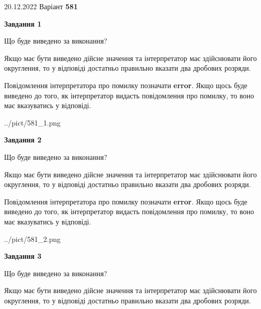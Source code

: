 \documentclass[12pt, ukrainian]{article}
\begin{document}
{20.12.2022 Варіант \No \textbf { 581 }\par}
{
\begin {Large}

{\begin {center}\textbf{Завдання 1}\end {center}}\par
Що буде виведено за виконання? \par

Якщо має бути виведено дійсне значення та інтерпретатор має здійснювати його округлення, 
то у відповіді достатньо правильно вказати два дробових розряди.

Повідомлення інтерпретатора про помилку позначати \textbf{error}.
Якщо щось буде виведено до того, як інтерпретатор видасть повідомлення про помилку, 
то воно має вказуватись у відповіді. \par

\begin{center}
	{../pict/581_1.png}
\end{center}
\newpage

{\begin {center}\textbf{Завдання 2}\end {center}}\par
Що буде виведено за виконання? \par

Якщо має бути виведено дійсне значення та інтерпретатор має здійснювати його округлення, 
то у відповіді достатньо правильно вказати два дробових розряди.

Повідомлення інтерпретатора про помилку позначати \textbf{error}.
Якщо щось буде виведено до того, як інтерпретатор видасть повідомлення про помилку, 
то воно має вказуватись у відповіді. \par

\begin{center}
	{../pict/581_2.png}
\end{center}
\newpage

{\begin {center}\textbf{Завдання 3}\end {center}}\par
Що буде виведено за виконання? \par

Якщо має бути виведено дійсне значення та інтерпретатор має здійснювати його округлення, 
то у відповіді достатньо правильно вказати два дробових розряди.


\end{Large}}
\end{document}
